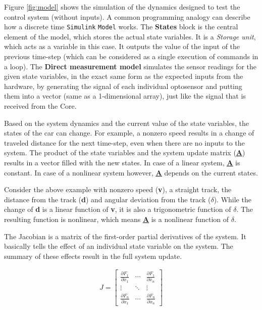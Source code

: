 Figure \ref{fig:model} shows the simulation of the dynamics designed to test the control system (without inputs). A common programming analogy can describe how a discrete time \verb!Simulink! \verb!Model! works. The \textbf{States} block is the central element of the model, which stores the actual state variables. It is a \emph{Storage unit}, which acts as a variable in this case. It outputs the value of the input of the previous time-step (which can be considered as a single execution of commands in a loop). The \textbf{Direct measurement model} simulates the sensor readings for the given state variables, in the exact same form as the expected inputs from the hardware, by generating the signal of each individual optosensor and putting them into a vector (same as a 1-dimensional array), just like the signal that is received from the Core.

Based on the system dynamics and the current value of the state variables, the states of the car can change. For example, a nonzero speed results in a change of traveled distance for the next time-step, even when there are no inputs to the system. The product of the state variables and the system update matrix (\textbf{\underline{\underline{A}}}) results in a vector filled with the new states. In case of a linear system, \textbf{\underline{\underline{A}}} is constant. In case of a nonlinear system however, \textbf{\underline{\underline{A}}} depends on the current states. 

Consider the above example with nonzero speed (\textbf{v}), a straight track, the distance from the track (\textbf{d}) and angular deviation from the track ($\delta$). While the change of \textbf{d} is a linear function of \textbf{v}, it is also a trigonometric function of $\delta$. The resulting function is nonlinear, which means \textbf{\underline{\underline{A}}} is a nonlinear function of $\delta$. 

The Jacobian is a matrix of the first-order partial derivatives of the system\cite{jacobian}. It basically tells the effect of an individual state variable on the system. The summary of these effects result in the full system update.

\begin{align}
J =
 \begin{bmatrix}
  \frac{\partial F_1}{\partial x_1} & \cdots & \frac{\partial F_1}{\partial x_n} \\
  \vdots  & \ddots & \vdots  \\
  \frac{\partial F_n}{\partial x_1} & \cdots & \frac{\partial F_n}{\partial x_n}
 \end{bmatrix}
\end{align}

